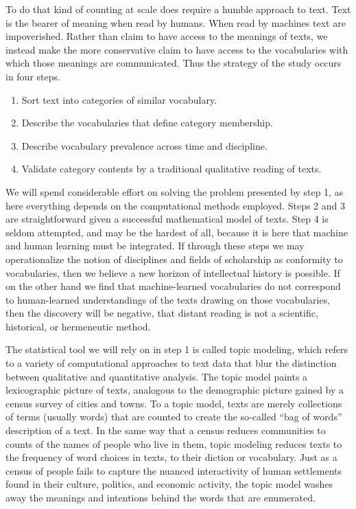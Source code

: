\documentclass[]{book}
\providecommand{\tightlist}{%
  \setlength{\itemsep}{0pt}\setlength{\parskip}{0pt}}
\theoremstyle{definition}
\theoremstyle{definition}
\theoremstyle{definition}
\theoremstyle{remark}
\begin{document}
To do that kind of counting at scale does require a humble approach to
text. Text is the bearer of meaning when read by humans. When read by
machines text are impoverished. Rather than claim to have access to the
meanings of texts, we instead make the more conservative claim to have
access to the vocabularies with which those meanings are communicated.
Thus the strategy of the study occurs in four steps.

\begin{enumerate}
\def\labelenumi{\arabic{enumi}.}
\tightlist
\item
  Sort text into categories of similar vocabulary.
\item
  Describe the vocabularies that define category membership.
\item
  Describe vocabulary prevalence across time and discipline.
\item
  Validate category contents by a traditional qualitative reading of
  texts.
\end{enumerate}

We will spend considerable effort on solving the problem presented by
step 1, as here everything depends on the computational methods
employed. Steps 2 and 3 are straightforward given a successful
mathematical model of texts. Step 4 is seldom attempted, and may be the
hardest of all, because it is here that machine and human learning must
be integrated. If through these steps we may operationalize the notion
of disciplines and fields of scholarship as conformity to vocabularies,
then we believe a new horizon of intellectual history is possible. If on
the other hand we find that machine-learned vocabularies do not
correspond to human-learned understandings of the texts drawing on those
vocabularies, then the discovery will be negative, that distant reading
is not a scientific, historical, or hermeneutic method.

The statistical tool we will rely on in step 1 is called topic modeling,
which refers to a variety of computational approaches to text data that
blur the distinction between qualitative and quantitative analysis. The
topic model paints a lexicographic picture of texts, analogous to the
demographic picture gained by a census survey of cities and towns. To a
topic model, texts are merely collections of terms (usually words) that
are counted to create the so-called ``bag of words'' description of a
text. In the same way that a census reduces communities to counts of the
names of people who live in them, topic modeling reduces texts to the
frequency of word choices in texts, to their diction or vocabulary. Just
as a census of people fails to capture the nuanced interactivity of
human settlements found in their culture, politics, and economic
activity, the topic model washes away the meanings and intentions behind
the words that are enumerated.
\end{document}
